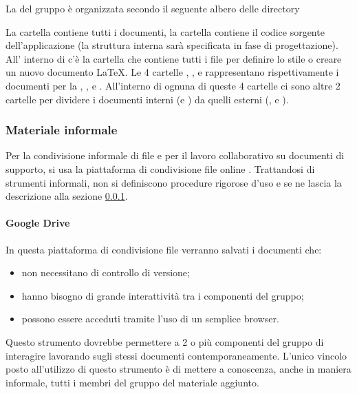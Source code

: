 \documentclass[12pt,a4paper]{article}
\begin{document}
La  del gruppo è organizzata secondo il seguente albero delle directory


La cartella  contiene tutti i documenti, la cartella  contiene il codice sorgente dell'applicazione (la struttura interna sarà specificata in fase di progettazione). All' interno di  c'è la cartella  che contiene tutti i file per definire lo stile o creare un nuovo documento \LaTeX{}. Le 4 cartelle , ,  e  rappresentano rispettivamente i documenti per la \RR, \RP, \RQ e \RA. All'interno di ognuna di queste 4 cartelle ci sono altre 2 cartelle per dividere i documenti interni (\NdP e \SdF) da quelli esterni (\AdR, \PdP e \PdQ).

\subsubsection{Materiale informale}\label{sec:matinf}
Per la condivisione informale di file e per il lavoro collaborativo su documenti di supporto, si usa la piattaforma di condivisione file online . Trattandosi di strumenti informali, non si definiscono procedure rigorose d’uso e se ne lascia la descrizione alla sezione \ref{sec:matinf}.

\paragraph{Google Drive}
In questa piattaforma di condivisione file verranno salvati i documenti che:
\begin{itemize}
	\item non necessitano di controllo di versione;
	\item hanno bisogno di grande interattività tra i componenti del gruppo;
	\item possono essere acceduti tramite l’uso di un semplice browser.
\end{itemize}

Questo strumento dovrebbe permettere a 2 o più componenti del gruppo di interagire lavorando sugli stessi documenti contemporaneamente.
L'unico vincolo posto all'utilizzo di questo strumento è di mettere a conoscenza, anche in maniera informale, tutti i membri del gruppo del materiale aggiunto.
\end{document}
